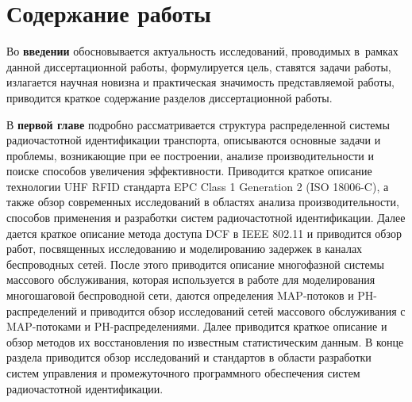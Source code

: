 \section*{Содержание работы}
Во \textbf{введении} обосновывается актуальность исследований, проводимых в~рамках данной диссертационной работы, формулируется цель, ставятся задачи работы, излагается научная новизна и практическая значимость представляемой работы, приводится краткое содержание разделов диссертационной работы.


В \textbf{первой главе} подробно рассматривается структура распределенной системы радиочастотной идентификации транспорта, описываются основные задачи и проблемы, возникающие при ее построении, анализе производительности и поиске способов увеличения эффективности. Приводится краткое описание технологии UHF RFID стандарта EPC Class 1 Generation 2 (ISO 18006-C), а также обзор современных исследований в областях анализа производительности, способов применения и разработки систем радиочастотной идентификации. Далее дается краткое описание метода доступа DCF в IEEE 802.11 и приводится обзор работ, посвященных исследованию и моделированию задержек в каналах беспроводных сетей. После этого приводится описание многофазной системы массового обслуживания, которая используется в работе для моделирования многошаговой беспроводной сети, даются определения MAP-потоков и PH-распределений и приводится обзор исследований сетей массового обслуживания с MAP-потоками и PH-распределениями. Далее приводится краткое описание и обзор методов их восстановления по известным статистическим данным. В конце раздела приводится обзор исследований и стандартов в области разработки систем управления и промежуточного программного обеспечения систем радиочастотной идентификации.




